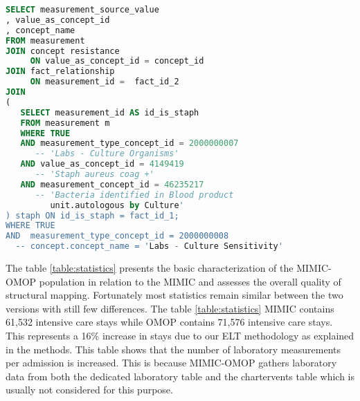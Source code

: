 \begin{lstlisting}[language=sql,basicstyle=\scriptsize,caption=Original table microbiology SQL query,label={lst:original}]
SELECT measurement_source_value
, value_as_concept_id
, concept_name
FROM measurement
JOIN concept resistance 
     ON value_as_concept_id = concept_id
JOIN fact_relationship 
     ON measurement_id =  fact_id_2
JOIN
(
   SELECT measurement_id AS id_is_staph
   FROM measurement m
   WHERE TRUE 
   AND measurement_type_concept_id = 2000000007        			
      -- 'Labs - Culture Organisms'
   AND value_as_concept_id = 4149419                     			
      -- 'Staph aureus coag +' 
   AND measurement_concept_id = 46235217               			
      -- 'Bacteria identified in Blood product 
         unit.autologous by Culture'
) staph ON id_is_staph = fact_id_1;
WHERE TRUE
AND  measurement_type_concept_id = 2000000008        			        
  -- concept.concept_name = 'Labs - Culture Sensitivity'
\end{lstlisting}


The table \ref{table:statistics} presents the basic characterization of the 
MIMIC-OMOP population in relation to the MIMIC and assesses the overall quality of 
structural mapping.
Fortunately most statistics remain similar between the two versions with still
few differences. The table \ref{table:statistics} MIMIC contains 61,532
intensive care stays while OMOP contains 71,576 intensive care stays. This
represents a 16\% increase in stays due to our ELT methodology as explained in
the methods. This table shows that the number of laboratory measurements per
admission is increased. This is because MIMIC-OMOP gathers laboratory data from
both the dedicated laboratory table and the chartervents table which is usually
not considered for this purpose.

